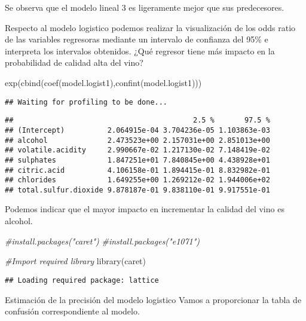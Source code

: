 \documentclass[
]{article}
\newenvironment{Shaded}{\begin{snugshade}}{\end{snugshade}}
\newcommand{\CommentTok}[1]{\textcolor[rgb]{0.56,0.35,0.01}{\textit{#1}}}
\newcommand{\FunctionTok}[1]{\textcolor[rgb]{0.00,0.00,0.00}{#1}}
\newcommand{\NormalTok}[1]{#1}
\begin{document}
Se observa que el modelo lineal 3 es ligeramente mejor que sus
predecesores.

Respecto al modelo logistico podemos realizar la visualización de los
odds ratio de las variables regresoras mediante un intervalo de
confianza del 95\% e interpreta los intervalos obtenidos. ¿Qué regresor
tiene más impacto en la probabilidad de calidad alta del vino?

\begin{Shaded}
\begin{Highlighting}[]
\FunctionTok{exp}\NormalTok{(}\FunctionTok{cbind}\NormalTok{(}\FunctionTok{coef}\NormalTok{(model.logist1),}\FunctionTok{confint}\NormalTok{(model.logist1)))}
\end{Highlighting}
\end{Shaded}

\begin{verbatim}
## Waiting for profiling to be done...
\end{verbatim}

\begin{verbatim}
##                                          2.5 %       97.5 %
## (Intercept)          2.064915e-04 3.704236e-05 1.103863e-03
## alcohol              2.473523e+00 2.157031e+00 2.851013e+00
## volatile.acidity     2.990667e-02 1.217130e-02 7.148419e-02
## sulphates            1.847251e+01 7.840845e+00 4.438928e+01
## citric.acid          4.106158e-01 1.894415e-01 8.832982e-01
## chlorides            1.649255e+00 1.269212e-02 1.944006e+02
## total.sulfur.dioxide 9.878187e-01 9.838110e-01 9.917551e-01
\end{verbatim}

Podemos indicar que el mayor impacto en incrementar la calidad del vino
es alcohol.

\begin{Shaded}
\begin{Highlighting}[]
\CommentTok{\#install.packages("caret")}
\CommentTok{\#install.packages("e1071")}
 
\CommentTok{\#Import required library}
\FunctionTok{library}\NormalTok{(caret)}
\end{Highlighting}
\end{Shaded}

\begin{verbatim}
## Loading required package: lattice
\end{verbatim}

Estimación de la precisión del modelo logistico Vamos a proporcionar la
tabla de confusión correspondiente al modelo.
\end{document}
